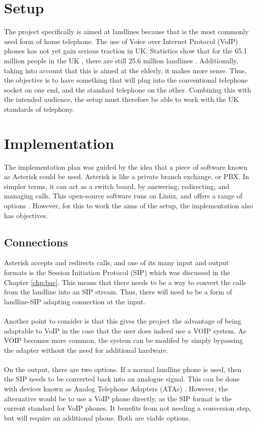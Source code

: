 \documentclass[main.tex]{subfiles}
\begin{document}
\section{Setup}
The project specifically is aimed at landlines because that is the most commonly used form of home telephone. The use of Voice over Internet Protocol (VoIP) phones has not yet gain serious traction in UK. Statistics show that for the 65.1 million people in the UK \cite{ons}, there are still 25.6 million landlines \cite{ofcom}. Additionally, taking into account that this is aimed at the elderly, it makes more sense. Thus, the objective is to have something that will plug into the conventional telephone socket on one end, and the standard telephone on the other. Combining this with the intended audience, the setup must therefore be able to work with the UK standards of telephony.

\section{Implementation}
The implementation plan was guided by the idea that a piece of software known as Asterisk could be used. Asterisk is like a private branch exchange, or PBX. In simpler terms, it can act as a switch board, by answering, redirecting, and managing calls. This open-source software runs on Linux, and offers a range of options \cite{asterisk}. However, for this to work the aims of the setup, the implementation also has objectives.

\subsection{Connections}
Asterisk accepts and redirects calls, and one of its many input and output formats is the Session Initiation Protocol (SIP) \cite{sip} which was discussed in the Chapter \ref{chp:bac}. This means that there needs to be a way to convert the calls from the landline into an SIP stream. Thus, there will need to be a form of landline-SIP adapting connection at the input.
\\\\
Another point to consider is that this gives the project the advantage of being adaptable to VoIP in the case that the user does indeed use a VOIP system. As VOIP becomes more common, the system can be modifed by simply bypassing the adapter without the need for additional hardware.
\\\\
On the output, there are two options. If a normal landline phone is used, then the SIP needs to be converted back into an analogue signal. This can be done with devices known as Analog Telephone Adapters (ATAs) \cite{ata}. However, the alternative would be to use a VoIP phone directly, as the SIP format is the current standard for VoIP phones. It benefits from not needing a conversion step, but will require an additional phone. Both are viable options.
\end{document}
